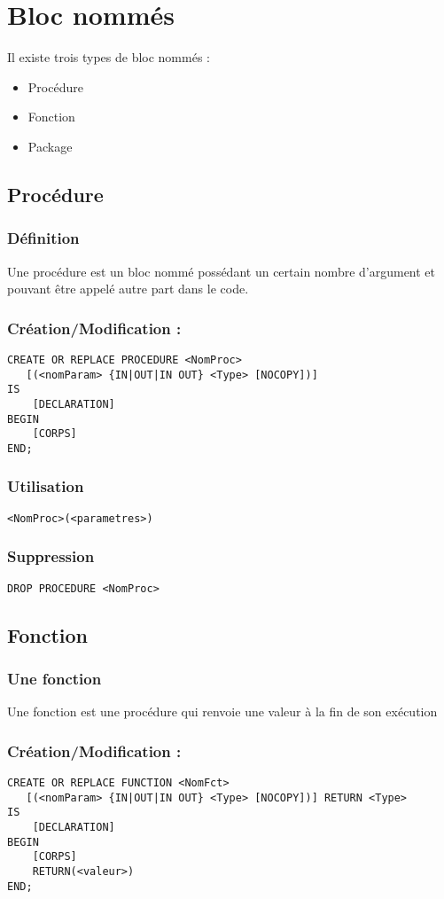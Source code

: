 \documentclass[10pt,a4paper,twoside]{article}
\begin{document}
\section{Bloc nommés}
Il existe trois types de bloc nommés :
\begin{itemize}
\item Procédure
\item Fonction
\item Package
\end{itemize}

\subsection{Procédure}
\subsubsection{Définition} 
Une procédure est un bloc nommé possédant un certain nombre d'argument et pouvant être appelé autre part dans le code.

\subsubsection{Création/Modification :}
\begin{verbatim}
CREATE OR REPLACE PROCEDURE <NomProc> 
   [(<nomParam> {IN|OUT|IN OUT} <Type> [NOCOPY])]
IS
    [DECLARATION]
BEGIN
    [CORPS]
END;
\end{verbatim}

\subsubsection{Utilisation}
\verb=<NomProc>(<parametres>)=

\subsubsection{Suppression}
\verb=DROP PROCEDURE <NomProc>=

\subsection{Fonction}
\subsubsection{Une fonction} 
Une fonction est une procédure qui renvoie une valeur à la fin de son exécution

\subsubsection{Création/Modification :}
\begin{verbatim}
CREATE OR REPLACE FUNCTION <NomFct> 
   [(<nomParam> {IN|OUT|IN OUT} <Type> [NOCOPY])] RETURN <Type>
IS
    [DECLARATION]
BEGIN
    [CORPS]
    RETURN(<valeur>)
END;
\end{verbatim}
\end{document}
